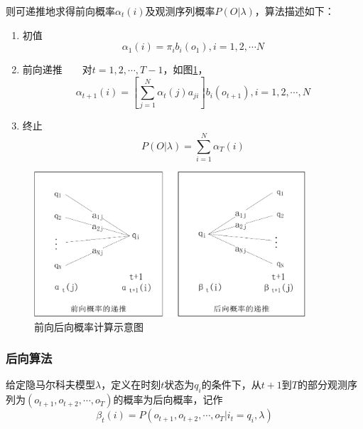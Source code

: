         则可递推地求得前向概率${\alpha _t}(i)$及观测序列概率$P(O|\lambda )$，算法描述如下：
        \begin{enumerate}
            \item 初值
                \begin{equation}
                    {\alpha _1}(i) = {\pi _i}{b_i}({o_1}),i = 1,2, \cdots N
                \end{equation}
            \item 前向递推~~~~对$t = 1,2, \cdots ,T - 1$，如图\ref{fig:forback}，
                \begin{equation}
                    {\alpha _{t + 1}}(i) = \left[ {\sum\limits_{j = 1}^N {{\alpha _t}(j){a_{ji}}} } \right]{b_i}({o_{t + 1}}),i = 1,2, \cdots ,N
                \end{equation}
            \item 终止
                \begin{equation}
                    P(O|\lambda ) = \sum\limits_{i = 1}^N {{\alpha _T}(i)}
                \end{equation}
        \end{enumerate}

        \begin{figure}[htbp]
        \centering
        \includegraphics[width=0.9\textwidth]{figures/chapter2/forback-crop}
        \caption{前向后向概率计算示意图}
        \label{fig:forback}
        \end{figure}

        \subsubsection{后向算法}
        \begin{definition}[后向算法]
         给定隐马尔科夫模型$\lambda$，定义在时刻$t$状态为$q_i$的条件下，从$t+1$到$T$的部分观测序列为$({o_{t+1}},{o_{t+2}},\cdots,{o_T})$的概率为后向概率，记作
             \begin{equation}
                 {\beta _t}(i) = P({o_{t + 1}},{o_{t + 2}}, \cdots ,{o_T}|{i_t} = {q_i},\lambda )
             \end{equation}
        \end{definition}

